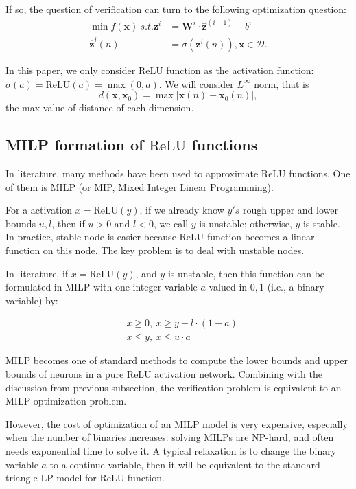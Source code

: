 \documentclass{llncs}
\newcommand{\ReLU}{\mathrm{ReLU}}
\begin{document}
If so, the question of verification can turn to the following optimization question: \begin{align*}
	\min f(\boldsymbol{x}) \ s.t. {\boldsymbol{z}}^{i} &= \boldsymbol{W}^i\cdot \hat{\boldsymbol{z}}^{(i-1)}+ b^i\\
	\hat{\boldsymbol{z}}^{i}(n) &= \sigma({\boldsymbol{z}}^i(n)), \boldsymbol{x}\in\mathcal{D}.
\end{align*}

In this paper, we only consider $\ReLU$ function as the activation function: $\sigma(a)=\ReLU(a)=\max(0,a)$. We will consider $L^{\infty}$ norm, that is $$d(\boldsymbol{x},\boldsymbol{x}_0)=\max |\boldsymbol{x}(n)-\boldsymbol{x}_0(n)|,$$ the max value of distance of each dimension.



\subsection{MILP formation of $\ReLU$ functions}

In literature, many methods have been used to approximate $\ReLU$ functions. One of them is MILP (or MIP, Mixed Integer Linear Programming).

For a activation $x=\ReLU(y)$, if we already know $y's$ rough upper and lower bounds $u,l$, then if $u>0$ and $l<0$, we call $y$ is unstable; otherwise, $y$ is stable. In practice, stable node is easier because $\ReLU$ function becomes a linear function on this node. The key problem is to deal with unstable nodes.

In literature, if $x=\ReLU(y)$, and $y$ is unstable, then this function can be formulated in MILP with one integer variable $a$ valued in ${0,1}$ (i.e., a binary variable) by:

\vspace*{-4ex}

\begin{align*}
	&x \geq 0, \ 
	x \geq y-l\cdot (1-a)\\
	&x \leq y,\ 
	x \leq u\cdot a
\end{align*} 

MILP becomes one of standard methods to compute the lower bounds and upper bounds of neurons in a pure $\ReLU$ activation network. Combining with the discussion from previous subsection, the verification problem is equivalent to an MILP optimization problem.

However, the cost of optimization of an MILP model is very expensive, especially when the number of binaries increases: solving MILPs are NP-hard, and often needs exponential time to solve it. A typical relaxation is to change the binary variable $a$ to a continue variable, then it will be equivalent to the standard triangle LP model for $\ReLU$ function.
\end{document}
